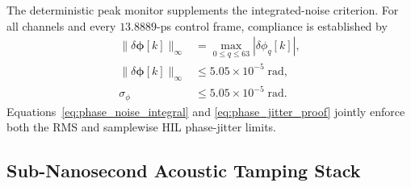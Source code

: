 \documentclass[10pt,twocolumn]{IEEEtran}
\begin{document}
The deterministic peak monitor supplements the integrated-noise criterion. For all channels and every $13.8889$-ps control frame, compliance is established by
\begin{equation}
\begin{aligned}
\|\delta\bm\phi[k]\|_{\infty}
&=\max_{0\leq q\leq63}|\delta\phi_q[k]|, \\
\|\delta\bm\phi[k]\|_{\infty}
&\leq5.05\times10^{-5}\;\mathrm{rad}, \\
\sigma_\phi
&\leq5.05\times10^{-5}\;\mathrm{rad}.
\end{aligned}
\label{eq:phase_jitter_proof}
\end{equation}
Equations~\eqref{eq:phase_noise_integral} and \eqref{eq:phase_jitter_proof} jointly enforce both the RMS and samplewise HIL phase-jitter limits.

\subsection{Sub-Nanosecond Acoustic Tamping Stack}
\end{document}
